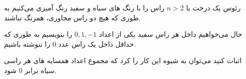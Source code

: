 \begin{PROBLEM}
	\p
	رئوس یک درخت با 
	$n > 2$
	راس را با رنگ های سیاه و سفید رنگ آمیزی می‌کنیم به طوری که هیچ دو راس  مجاوری، همرنگ نباشند.

	حال می‌خواهیم داخل هر راس سفید یکی از اعداد 
	$0, 1, -1$
	را بنویسیم به طوری که حداقل داخل یک راس عدد 
	$0$
	را ننوشته باشیم.

	اثبات کنید می‌توان به شیوه این کار را کرد که مجموع اعداد همسایه های هر راسی سیاه برابر 
	$0$
	شود.
	\SOLUTION{
		\p

	}
\end{PROBLEM}